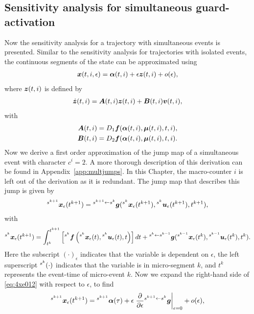 \documentclass[../DC2017114Bouma.tex]{subfiles}
\begin{document}
\subsection{Sensitivity analysis for simultaneous guard-activation}
Now the sensitivity analysis for a trajectory with simultaneous events is presented. Similar to the sensitivity analysis for trajectories with isolated events, the continuous segments of the state can be approximated using
\begin{align}
{\boldsymbol{x}}(t,i,\epsilon) = \boldsymbol{\alpha}(t,i) + \epsilon{\boldsymbol{z}}(t,i) + o(\epsilon),
\end{align}
where ${\boldsymbol{z}}(t,i)$ is defined by
\begin{align}
\dot{{\boldsymbol{z}}}(t,i) = {\boldsymbol{A}}(t,i){\boldsymbol{z}}(t,i) +{\boldsymbol{B}}(t,i){\boldsymbol{v}}(t,i),
\end{align}
with
\begin{align}
{\boldsymbol{A}}(t,i) &= D_1{\boldsymbol{f}}(\boldsymbol{\alpha}(t,i),\boldsymbol{\mu}(t,i),t,i),\\
{\boldsymbol{B}}(t,i) &= D_2{\boldsymbol{f}}(\boldsymbol{\alpha}(t,i),\boldsymbol{\mu}(t,i),t,i).
\end{align}
Now we derive a first order approximation of the jump map of a simultaneous event with character $c^i = 2$. A more thorough description of this derivation can be found in Appendix~\ref{app:multjumps}. In this Chapter, the macro-counter $i$ is left out of the derivation as it is redundant. The jump map that describes this jump is given by
\begin{align}
\hspace{0cm}^{s^{k+1}}{\boldsymbol{x}}_\epsilon(t^{k+1}) = \hspace{0cm}^{s^{k+1}\leftarrow s^k}{\boldsymbol{g}}(\hspace{0cm}^{s^{k}}{\boldsymbol{x}}_\epsilon(t^{k+1}),\hspace{0cm}^{s^{k}}{\boldsymbol{u}}_\epsilon(t^{k+1}),t^{k+1}),\label{eq:4xe012}
\end{align}
with
\begin{align}
\hspace{0cm}^{s^{k}}{\boldsymbol{x}}_\epsilon(t^{k+1}) = \int_{t^{k}}^{t^{k+1}}\left[\hspace{0cm}^{s^{k}}{\boldsymbol{f}}\left(\hspace{0cm}^{s^{k}}{\boldsymbol{x}}_\epsilon(t),\hspace{0cm}^{s^{k}}{\boldsymbol{u}}_\epsilon(t),t\right)\right]dt + \hspace{0cm}^{s^{k}\leftarrow s^{k-1}}{\boldsymbol{g}}(\hspace{0cm}^{s^{k-1}}{\boldsymbol{x}}_\epsilon(t^{k}),\hspace{0cm}^{s^{k-1}}{\boldsymbol{u}}_\epsilon(t^{k}),t^{k}).\label{eq:4xe01}
\end{align}
Here the subscript $(\cdot)_\epsilon$ indicates that the variable is dependent on $\epsilon$, the left superscript $\hspace{0cm}^{s^k}(\cdot)$ indicates that the variable is in micro-segment $k$, and $t^k$ represents the event-time of micro-event $k$. Now we expand the right-hand side of \eqref{eq:4xe012} with respect to $\epsilon$, to find
\begin{align}
\hspace{0cm}^{s^{k+1}}{\boldsymbol{x}}_\epsilon(t^{k+1}) = \hspace{0cm}^{s^{k+1}}\boldsymbol{\alpha}(\tau) + \epsilon\left.\frac{\partial}{\partial\epsilon}\hspace{0cm}^{s^{k+1}\leftarrow s^k}{\boldsymbol{g}}\right|_{\epsilon=0} + o(\epsilon),\label{eq:4xe012exp}
\end{align}
\end{document}
